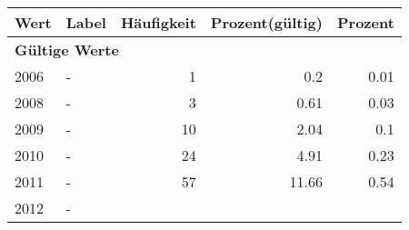      \begin{longtable}{lXrrr}
     \toprule
     \textbf{Wert} & \textbf{Label} & \textbf{Häufigkeit} & \textbf{Prozent(gültig)} & \textbf{Prozent} \\
     \endhead
     \midrule
     \multicolumn{5}{l}{\textbf{Gültige Werte}}\\

     2006 &
     \multicolumn{1}{X}{ -  } &


       \num{1} &
       \num[round-mode=places,round-precision=2]{0,2} &
         \num[round-mode=places,round-precision=2]{0,01} \\

     2008 &
     \multicolumn{1}{X}{ -  } &


       \num{3} &
       \num[round-mode=places,round-precision=2]{0,61} &
         \num[round-mode=places,round-precision=2]{0,03} \\

     2009 &
     \multicolumn{1}{X}{ -  } &


       \num{10} &
       \num[round-mode=places,round-precision=2]{2,04} &
         \num[round-mode=places,round-precision=2]{0,1} \\

     2010 &
     \multicolumn{1}{X}{ -  } &


       \num{24} &
       \num[round-mode=places,round-precision=2]{4,91} &
         \num[round-mode=places,round-precision=2]{0,23} \\

     2011 &
     \multicolumn{1}{X}{ -  } &


       \num{57} &
       \num[round-mode=places,round-precision=2]{11,66} &
         \num[round-mode=places,round-precision=2]{0,54} \\

     2012 &
     \multicolumn{1}{X}{ -  } &



\end{longtable}
